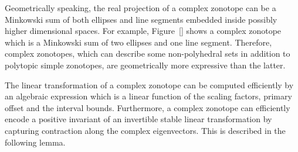 %
Geometrically speaking, the real projection of a complex zonotope can
be a Minkowski sum of both ellipses and line segments embedded inside
possibly higher dimensional spaces.  For example, Figure~\ref{} shows
a complex zonotope which is a Minkowski sum of two ellipses and one
line segment.  Therefore, complex zonotopes, which can describe some
non-polyhedral sets in addition to polytopic simple zonotopes, are
geometrically more expressive than the latter.

The linear transformation of a complex zonotope can be computed
efficiently by an algebraic expression which is a linear function of
the scaling factors, primary offset and the interval bounds.
Furthermore, a complex zonotope can efficiently encode a positive
invariant of an invertible stable linear transformation by capturing
contraction along the complex eigenvectors.  This is described in the
following lemma.
%
\begin{lemma}

\end{lemma}
%
